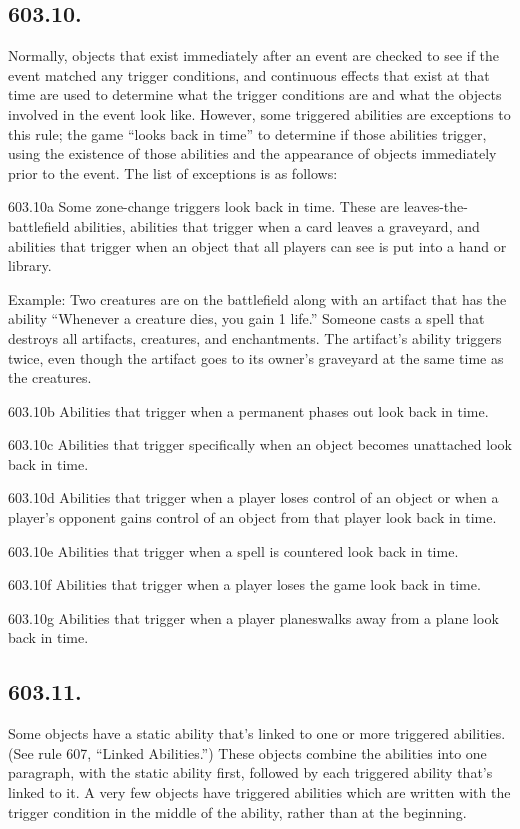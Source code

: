 \subsection*{603.10.}
Normally, objects that exist immediately after an event are checked to see if the event matched any trigger conditions, and continuous effects that exist at that time are used to determine what the trigger conditions are and what the objects involved in the event look like. However, some triggered abilities are exceptions to this rule; the game “looks back in time” to determine if those abilities trigger, using the existence of those abilities and the appearance of objects immediately prior to the event. The list of exceptions is as follows:

603.10a Some zone-change triggers look back in time. These are leaves-the-battlefield abilities, abilities that trigger when a card leaves a graveyard, and abilities that trigger when an object that all players can see is put into a hand or library.

Example: Two creatures are on the battlefield along with an artifact that has the ability “Whenever a creature dies, you gain 1 life.” Someone casts a spell that destroys all artifacts, creatures, and enchantments. The artifact’s ability triggers twice, even though the artifact goes to its owner’s graveyard at the same time as the creatures.

603.10b Abilities that trigger when a permanent phases out look back in time.

603.10c Abilities that trigger specifically when an object becomes unattached look back in time.

603.10d Abilities that trigger when a player loses control of an object or when a player’s opponent gains control of an object from that player look back in time.

603.10e Abilities that trigger when a spell is countered look back in time.

603.10f Abilities that trigger when a player loses the game look back in time.

603.10g Abilities that trigger when a player planeswalks away from a plane look back in time.

\subsection*{603.11.}
Some objects have a static ability that’s linked to one or more triggered abilities. (See rule 607, “Linked Abilities.”) These objects combine the abilities into one paragraph, with the static ability first, followed by each triggered ability that’s linked to it. A very few objects have triggered abilities which are written with the trigger condition in the middle of the ability, rather than at the beginning.


